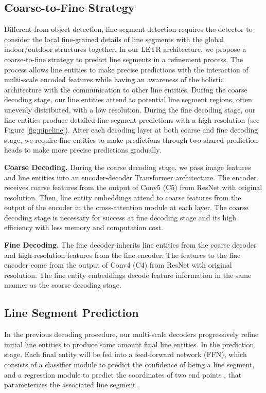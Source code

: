 \documentclass[final]{cvpr}
\begin{document}
\subsection{Coarse-to-Fine Strategy}
\vspace{-2mm}
Different from object detection, line segment detection requires the detector to consider the local fine-grained details of line segments with the global indoor/outdoor structures together. In our LETR architecture, we propose a coarse-to-fine strategy to predict line segments in a refinement process. The process allows line entities to make precise predictions with the interaction of multi-scale encoded features while having an awareness of the holistic architecture with the communication to other line entities. During the coarse decoding stage, our line entities attend to potential line segment regions, often unevenly distributed, with a low resolution. During the fine decoding stage, our line entities produce detailed line segment predictions with a high resolution (see Figure \ref{fig:pipeline}). After each decoding layer at both coarse and fine decoding stage, we require line entities to make predictions through two shared prediction heads to make more precise predictions gradually.   

\noindent\textbf{Coarse Decoding.} 
During the coarse decoding stage, we pass image features and line entities into an encoder-decoder Transformer architecture. The encoder receives coarse features from the output of Conv5 (C5) from ResNet with  original resolution. Then, line entity embeddings attend to coarse features from the output of the encoder in the cross-attention module at each layer. The coarse decoding stage is necessary for success at fine decoding stage and its high efficiency with less memory and computation cost. 

\noindent\textbf{Fine Decoding.}
The fine decoder inherits line entities from the coarse decoder and high-resolution features from the fine encoder. The features to the fine encoder come from the output of Conv4 (C4) from ResNet with  original resolution. The line entity embeddings decode feature information in the same manner as the coarse decoding stage. 

\subsection{Line Segment Prediction}
\vspace{-2mm}
In the previous decoding procedure, our multi-scale decoders progressively refine  initial line entities to produce same amount final line entities. In the prediction stage. Each final entity  will be fed into a feed-forward network (FFN), which consists of a classifier module to predict the confidence  of being a line segment, and a regression module to predict the coordinates of two end points ,  that parameterizes the associated line segment . 
\vspace{-2mm}
\end{document}
